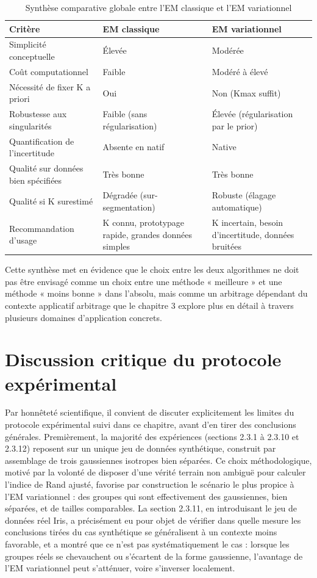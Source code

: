 \begin{table}[H]
\centering
\small
\setlength{\tabcolsep}{0.14cm}
\begin{tabular}{|p{4.84cm}|p{4.84cm}|p{4.84cm}|}
\hline
\textbf{Critère} & \textbf{EM classique} & \textbf{EM variationnel} \\
\hline
Simplicité conceptuelle & Élevée & Modérée \\
\hline
Coût computationnel & Faible & Modéré à élevé \\
\hline
Nécessité de fixer K a priori & Oui & Non (Kmax suffit) \\
\hline
Robustesse aux singularités & Faible (sans régularisation) & Élevée (régularisation par le prior) \\
\hline
Quantification de l'incertitude & Absente en natif & Native \\
\hline
Qualité sur données bien spécifiées & Très bonne & Très bonne \\
\hline
Qualité si K surestimé & Dégradée (sur-segmentation) & Robuste (élagage automatique) \\
\hline
Recommandation d'usage & K connu, prototypage rapide, grandes données simples & K incertain, besoin d'incertitude, données bruitées \\
\hline
\end{tabular}
\caption{Synthèse comparative globale entre l'EM classique et l'EM variationnel}
\label{tab:2_17}
\end{table}
Cette synthèse met en évidence que le choix entre les deux algorithmes ne doit pas être envisagé comme un choix entre une méthode « meilleure » et une méthode « moins bonne » dans l'absolu, mais comme un arbitrage dépendant du contexte applicatif  arbitrage que le chapitre 3 explore plus en détail à travers plusieurs domaines d'application concrets.

\section{Discussion critique du protocole expérimental}
Par honnêteté scientifique, il convient de discuter explicitement les limites du protocole expérimental suivi dans ce chapitre, avant d'en tirer des conclusions générales. Premièrement, la majorité des expériences (sections 2.3.1 à 2.3.10 et 2.3.12) reposent sur un unique jeu de données synthétique, construit par assemblage de trois gaussiennes isotropes bien séparées. Ce choix méthodologique, motivé par la volonté de disposer d'une vérité terrain non ambiguë pour calculer l'indice de Rand ajusté, favorise par construction le scénario le plus propice à l'EM variationnel : des groupes qui sont effectivement des gaussiennes, bien séparées, et de tailles comparables. La section 2.3.11, en introduisant le jeu de données réel Iris, a précisément eu pour objet de vérifier dans quelle mesure les conclusions tirées du cas synthétique se généralisent à un contexte moins favorable, et a montré que ce n'est pas systématiquement le cas : lorsque les groupes réels se chevauchent ou s'écartent de la forme gaussienne, l'avantage de l'EM variationnel peut s'atténuer, voire s'inverser localement.

